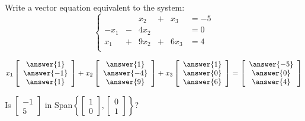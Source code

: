 \documentclass{ximera}
\begin{document}
  	\begin{question}
  		Write a vector equation equivalent to the system:
  			$$\left\{
  			\begin{array}{rrrrrl}
  			&&x_2&+&x_3 &=-5 \\
  			-x_1& -&4x_2 &&&=0\\
  			x_1&+&9x_2&+&6x_3 &= 4\\
  			\end{array} \right.$$
  		
  	$x_1\left[\begin{array}{c}
  		\answer{1}\\\answer{-1}\\\answer{1}
  		\end{array}\right] +x_2 \left[\begin{array}{c}
  		\answer{1}\\\answer{-4}\\\answer{9}
  	\end{array}\right]+x_3\left[\begin{array}{c}
  		\answer{1}\\\answer{0}\\\answer{6}
  	\end{array}\right] =\left[\begin{array}{c}
  		\answer{-5}\\\answer{0}\\\answer{4}
  		\end{array}\right]$
  			
  			\end{question}
  			
  			 	\begin{question}
  			 		Is $\begin{bmatrix} -1\\5\end{bmatrix}$ in Span$\left\{  \begin{bmatrix} 1\\0\end{bmatrix}, \begin{bmatrix} 0\\1\end{bmatrix}   \right\}$?
  			 		\begin{multipleChoice}
  			 		\end{multipleChoice}
  			 		
  			 	\end{question}
  	
  	
\end{document}

